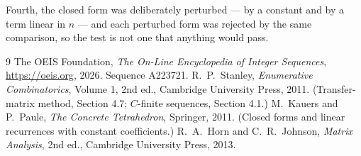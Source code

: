 \documentclass[11pt,a4paper]{article}
\theoremstyle{plain}
\theoremstyle{definition}
\begin{document}
Fourth, the closed form was deliberately perturbed --- by a constant and by a term linear in
$n$ --- and each perturbed form was rejected by the same comparison, so the test is not one
that anything would pass.

\begin{thebibliography}{9}
 The OEIS Foundation, \emph{The On-Line Encyclopedia of Integer
Sequences}, \url{https://oeis.org}, 2026. Sequence A223721.
 R.~P.~Stanley, \emph{Enumerative Combinatorics}, Volume 1, 2nd ed.,
Cambridge University Press, 2011. (Transfer-matrix method, Section 4.7; $C$-finite sequences,
Section 4.1.)
 M.~Kauers and P.~Paule, \emph{The Concrete Tetrahedron}, Springer, 2011.
(Closed forms and linear recurrences with constant coefficients.)
 R.~A.~Horn and C.~R.~Johnson, \emph{Matrix Analysis}, 2nd ed., Cambridge
University Press, 2013.
\end{thebibliography}
\end{document}
